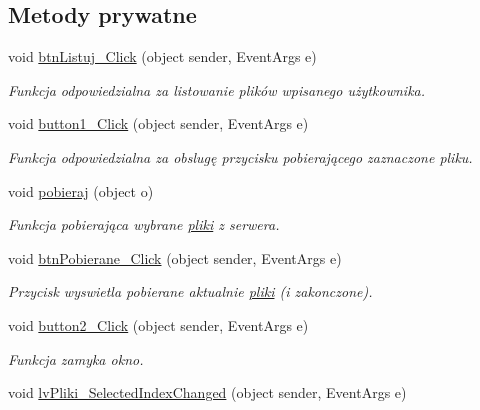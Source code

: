 \subsection*{Metody prywatne}
\begin{CompactItemize}
\item 
void \hyperlink{a00003_e934f222567288447b30be318da95ba7}{btnListuj\_\-Click} (object sender, EventArgs e)
\begin{CompactList}\small\item\em Funkcja odpowiedzialna za listowanie plików wpisanego użytkownika. \item\end{CompactList}\item 
void \hyperlink{a00003_3565ea2384b6428312fa310aad4c7e25}{button1\_\-Click} (object sender, EventArgs e)
\begin{CompactList}\small\item\em Funkcja odpowiedzialna za obslugę przycisku pobierającego zaznaczone pliku. \item\end{CompactList}\item 
void \hyperlink{a00003_21b906fd66030071dd1057fe32efeca1}{pobieraj} (object o)
\begin{CompactList}\small\item\em Funkcja pobierająca wybrane \hyperlink{a00017}{pliki} z serwera. \item\end{CompactList}\item 
void \hyperlink{a00003_1fb4fa2454ffdf753cce1637657029c8}{btnPobierane\_\-Click} (object sender, EventArgs e)
\begin{CompactList}\small\item\em Przycisk wyswietla pobierane aktualnie \hyperlink{a00017}{pliki} (i zakonczone). \item\end{CompactList}\item 
void \hyperlink{a00003_657650d2f810f254f265eb4956810386}{button2\_\-Click} (object sender, EventArgs e)
\begin{CompactList}\small\item\em Funkcja zamyka okno. \item\end{CompactList}\item 
void \hyperlink{a00003_8f11bfa541be459982c72ad615898de7}{lvPliki\_\-SelectedIndexChanged} (object sender, EventArgs e)
\end{CompactItemize}
